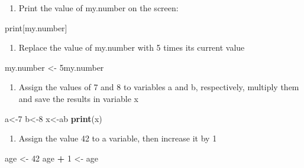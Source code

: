 \documentclass[
]{book}
\newenvironment{Shaded}{\begin{snugshade}}{\end{snugshade}}
\newcommand{\DecValTok}[1]{\textcolor[rgb]{0.00,0.00,0.81}{#1}}
\newcommand{\KeywordTok}[1]{\textcolor[rgb]{0.13,0.29,0.53}{\textbf{#1}}}
\newcommand{\NormalTok}[1]{#1}
\newcommand{\OperatorTok}[1]{\textcolor[rgb]{0.81,0.36,0.00}{\textbf{#1}}}
\newcommand{\StringTok}[1]{\textcolor[rgb]{0.31,0.60,0.02}{#1}}
\providecommand{\tightlist}{%
  \setlength{\itemsep}{0pt}\setlength{\parskip}{0pt}}
\theoremstyle{definition}
\theoremstyle{definition}
\theoremstyle{definition}
\theoremstyle{remark}
\begin{document}
\begin{enumerate}
\def\labelenumi{\arabic{enumi}.}
\setcounter{enumi}{4}
\tightlist
\item
  Print the value of my.number on the screen:
\end{enumerate}

\begin{Shaded}
\begin{Highlighting}[]
\NormalTok{print[my.number]}
\end{Highlighting}
\end{Shaded}

\begin{enumerate}
\def\labelenumi{\arabic{enumi}.}
\setcounter{enumi}{5}
\tightlist
\item
  Replace the value of my.number with 5 times its current value
\end{enumerate}

\begin{Shaded}
\begin{Highlighting}[]
\NormalTok{my.number \textless{}{-}}\StringTok{ }\NormalTok{5my.number }
\end{Highlighting}
\end{Shaded}

\begin{enumerate}
\def\labelenumi{\arabic{enumi}.}
\setcounter{enumi}{6}
\tightlist
\item
  Assign the values of 7 and 8 to variables a and b, respectively, multiply them and save the results in variable x
\end{enumerate}

\begin{Shaded}
\begin{Highlighting}[]
\NormalTok{a\textless{}{-}}\DecValTok{7}
\NormalTok{b\textless{}{-}}\DecValTok{8}
\NormalTok{x\textless{}{-}ab}
\KeywordTok{print}\NormalTok{(x)}
\end{Highlighting}
\end{Shaded}

\begin{enumerate}
\def\labelenumi{\arabic{enumi}.}
\setcounter{enumi}{8}
\tightlist
\item
  Assign the value 42 to a variable, then increase it by 1
\end{enumerate}

\begin{Shaded}
\begin{Highlighting}[]
\NormalTok{age \textless{}{-}}\StringTok{ }\DecValTok{42}
\NormalTok{age }\OperatorTok{+}\StringTok{ }\DecValTok{1}\NormalTok{ \textless{}{-}}\StringTok{ }\NormalTok{age}
\end{Highlighting}
\end{Shaded}
\end{document}
